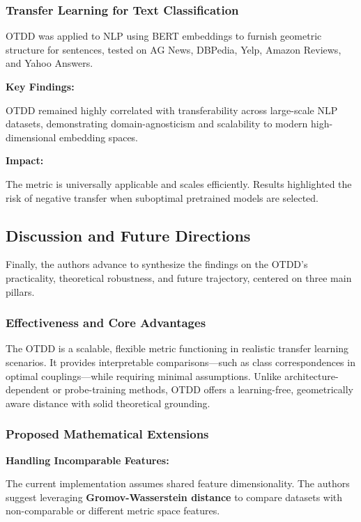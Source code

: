 \documentclass[11pt, a4paper]{article}
\theoremstyle{plain} %
\theoremstyle{definition} %
\begin{document}
			\subsubsection{Transfer Learning for Text Classification}
			\label{sec:transfer_learning_text_classification}
				OTDD was applied to NLP using BERT embeddings to furnish geometric structure for sentences, tested on AG News, DBPedia, Yelp, Amazon Reviews, and Yahoo Answers.

				\textbf{Key Findings:}

				OTDD remained highly correlated with transferability across large-scale NLP datasets, demonstrating domain-agnosticism and scalability to modern high-dimensional embedding spaces.

				\textbf{Impact:}

				The metric is universally applicable and scales efficiently. Results highlighted the risk of negative transfer when suboptimal pretrained models are selected.


		\subsection{Discussion and Future Directions}
		\label{sec:discussion_future_directions}
			Finally, the authors advance to synthesize the findings on the OTDD's practicality, theoretical robustness, and future trajectory, centered on three main pillars.

			\subsubsection{Effectiveness and Core Advantages}
			\label{sec:effectivemess_and_core_advantages}
				The OTDD is a scalable, flexible metric functioning in realistic transfer learning scenarios. It provides interpretable comparisons—such as class correspondences in optimal couplings—while requiring minimal assumptions. Unlike architecture-dependent or probe-training methods, OTDD offers a learning-free, geometrically aware distance with solid theoretical grounding.

			\subsubsection{Proposed Mathematical Extensions}
			\label{sec:proposed_mathematical_extensions}
				\textbf{Handling Incomparable Features:}

				The current implementation assumes shared feature dimensionality. The authors suggest leveraging \textbf{Gromov-Wasserstein distance} to compare datasets with non-comparable or different metric space features.
\end{document}
